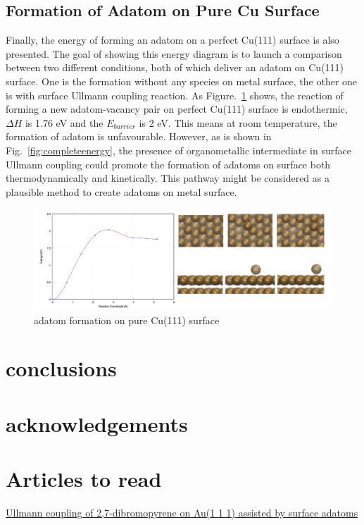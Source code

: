 \documentclass[%
 reprint,
 amsmath,amssymb,
 aps,
prb,
]{revtex4-2}
\begin{document}
\subsection{Formation of Adatom on Pure Cu Surface}

Finally, the energy of forming an adatom on a perfect Cu(111) surface is also presented. The goal of showing this energy diagram is to launch a comparison between two different conditions, both of which deliver an adatom on Cu(111) surface. One is the formation without any species on metal surface, the other one is with surface Ullmann coupling reaction.
As Figure.~\ref{fig:pureadatomform} shows, the reaction of forming a new adatom-vacancy pair on perfect Cu(111) surface is endothermic, $\Delta H$ is 1.76 eV and the $E_{barrier}$ is 2 eV. This means at room temperature, the formation of adatom is unfavourable. 
However, as is shown in Fig.~\ref{fig:completeenergy}, the presence of organometallic intermediate in surface Ullmann coupling could promote the formation of adatoms on surface both thermodynamically and kinetically. This pathway might be considered as a plausible method to create adatoms on metal surface.

\begin{figure}[hbt]
\centering
\includegraphics[width=1.0\textwidth]{Fig/pureadatomform.png}
\caption{adatom formation on pure Cu(111) surface}
\label{fig:pureadatomform}
\end{figure}

\section{conclusions}

\section{acknowledgements}

\section{Articles to read}

\href{https://doi.org/10.1016/j.apsusc.2020.145797}{Ullmann coupling of 2,7-dibromopyrene on Au(1 1 1) assisted by surface adatoms}

\nocite{*}

\end{document}
